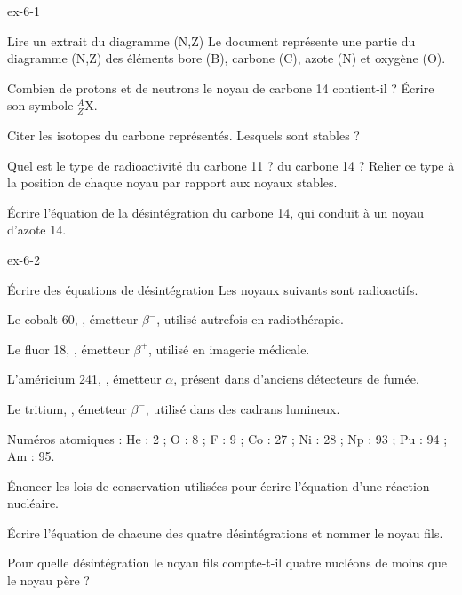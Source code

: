 \begin{blocLivre}{ex-6-1}
\begin{exercice}[1]{Lire un extrait du diagramme (N,Z)}
Le document représente une partie du diagramme (N,Z) des éléments bore (B), carbone (C), azote (N) et oxygène (O).
\begin{questions}
\item Combien de protons et de neutrons le noyau de carbone 14 contient-il ? Écrire son symbole $^A_Z\mathrm{X}$.
\item Citer les isotopes du carbone représentés. Lesquels sont stables ?
\item Quel est le type de radioactivité du carbone 11 ? du carbone 14 ? Relier ce type à la position de chaque noyau
par rapport aux noyaux stables.
\item Écrire l'équation de la désintégration du carbone 14, qui conduit à un noyau d'azote 14.
\end{questions}
\end{exercice}
\end{blocLivre}
\begin{blocLivre}{ex-6-2}
\begin{exercice}[1]{Écrire des équations de désintégration}
Les noyaux suivants sont radioactifs.
\begin{questions}[label=\otLabel{\Alph*.},leftmargin=1.9em,itemsep=0pt,parsep=0.15em]
\item Le cobalt 60, , émetteur $\beta^-$, utilisé autrefois en radiothérapie.
\item Le fluor 18, , émetteur $\beta^+$, utilisé en imagerie médicale.
\item L'américium 241, , émetteur $\alpha$, présent dans d'anciens détecteurs de fumée.
\item Le tritium, , émetteur $\beta^-$, utilisé dans des cadrans lumineux.
\end{questions}
\begin{donnees}
Numéros atomiques : He : 2 ; O : 8 ; F : 9 ; Co : 27 ; Ni : 28 ; Np : 93 ; Pu : 94 ; Am : 95.
\end{donnees}
\begin{questions}
\item Énoncer les lois de conservation utilisées pour écrire l'équation d'une réaction nucléaire.
\item Écrire l'équation de chacune des quatre désintégrations et nommer le noyau fils.
\item Pour quelle désintégration le noyau fils compte-t-il quatre nucléons de moins que le noyau père ?
\end{questions}
\end{exercice}
\end{blocLivre}
